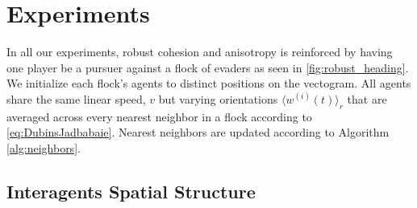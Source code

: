 \section{Experiments}
\label{sec:expts}
%
In all our experiments, robust cohesion and anisotropy is reinforced by having one player be a pursuer against a flock of evaders as seen in \autoref{fig:robust_heading}. We initialize each flock's agents to distinct positions on the vectogram. All agents share the same linear speed, $v$ but varying orientations $\langle w^{(i)} (t) \rangle_r$ that are averaged across every nearest neighbor in a flock according to \eqref{eq:DubinsJadbabaie}. Nearest neighbors are updated according to Algorithm \ref{alg:neighbors}.
%

\subsection{Interagents Spatial Structure}

